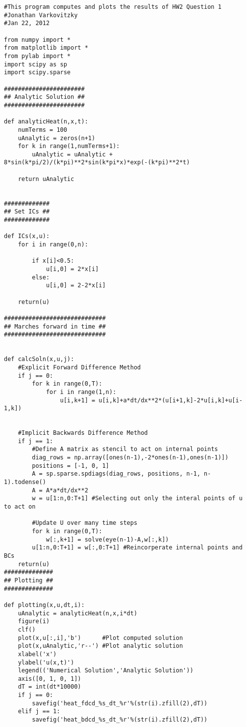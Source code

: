 \documentclass[a4paper,12pt,titlepage]{article}
\begin{document}
\begin{verbatim}
#This program computes and plots the results of HW2 Question 1
#Jonathan Varkovitzky
#Jan 22, 2012

from numpy import *
from matplotlib import *
from pylab import *
import scipy as sp
import scipy.sparse

#######################
## Analytic Solution ##
#######################

def analyticHeat(n,x,t):
    numTerms = 100
    uAnalytic = zeros(n+1)
    for k in range(1,numTerms+1):
        uAnalytic = uAnalytic + 8*sin(k*pi/2)/(k*pi)**2*sin(k*pi*x)*exp(-(k*pi)**2*t)

    return uAnalytic


#############
## Set ICs ##
#############

def ICs(x,u):
    for i in range(0,n):
        
        if x[i]<0.5:
            u[i,0] = 2*x[i]
        else:
            u[i,0] = 2-2*x[i]
            
    return(u)

#############################
## Marches forward in time ##
#############################


def calcSoln(x,u,j):
    #Explicit Forward Difference Method
    if j == 0: 
        for k in range(0,T):
            for i in range(1,n):
                u[i,k+1] = u[i,k]+a*dt/dx**2*(u[i+1,k]-2*u[i,k]+u[i-1,k])


    #Implicit Backwards Difference Method
    if j == 1:
        #Define A matrix as stencil to act on internal points
        diag_rows = np.array([ones(n-1),-2*ones(n-1),ones(n-1)])
        positions = [-1, 0, 1]
        A = sp.sparse.spdiags(diag_rows, positions, n-1, n-1).todense()
        A = A*a*dt/dx**2
        w = u[1:n,0:T+1] #Selecting out only the interal points of u to act on

        #Update U over many time steps
        for k in range(0,T):
            w[:,k+1] = solve(eye(n-1)-A,w[:,k])
        u[1:n,0:T+1] = w[:,0:T+1] #Reincorperate internal points and BCs
    return(u)
##############
## Plotting ##
##############

def plotting(x,u,dt,i):
    uAnalytic = analyticHeat(n,x,i*dt)
    figure(i)
    clf()
    plot(x,u[:,i],'b')      #Plot computed solution
    plot(x,uAnalytic,'r--') #Plot analytic solution
    xlabel('x')
    ylabel('u(x,t)')
    legend(('Numerical Solution','Analytic Solution'))
    axis([0, 1, 0, 1])
    dT = int(dt*10000)
    if j == 0:
        savefig('heat_fdcd_%s_dt_%r'%(str(i).zfill(2),dT))
    elif j == 1:
        savefig('heat_bdcd_%s_dt_%r'%(str(i).zfill(2),dT))


\end{verbatim}
\end{document}
